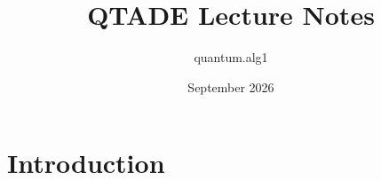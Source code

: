\documentclass{article}
\title{QTADE Lecture Notes}
\author{quantum.alg1 }
\date{September 2026}
\begin{document}
\maketitle

\section{Introduction}
\end{document}
